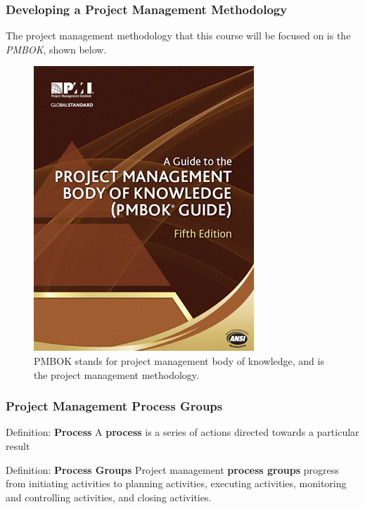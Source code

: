 \documentclass{beamer}
\begin{document}
\begin{frame}
\frametitle{Developing a Project Management Methodology}
The project management methodology that this course will be focused on is the \textit{PMBOK}, shown below.
\begin{figure}
\includegraphics[scale=0.3]{pmbok_guide}
\caption{PMBOK stands for project management body of knowledge, and is the project management methodology.}
\end{figure}
\end{frame}

\begin{frame}
\frametitle{Project Management Process Groups}
\begin{block}{Definition: \textbf{Process}}
A \textbf{process} is a series of actions directed towards a particular result
\end{block}
\vspace{0.5cm}
\begin{block}{Definition: \textbf{Process Groups}}
Project management \textbf{process groups} progress from initiating activities to planning activities, executing activities, monitoring and controlling activities, and closing activities.
\end{block}

\end{frame}

\end{document}
